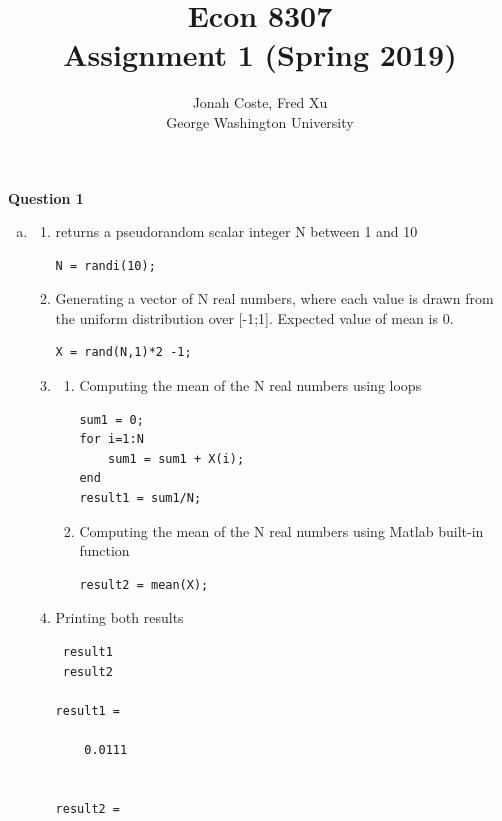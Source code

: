 \documentclass[12pt]{article}
\begin{document}
\begin{onehalfspace}


\title{Econ 8307\\ Assignment 1 (Spring 2019)}
\author{Jonah Coste, Fred Xu\\George Washington University}
\date{}
\maketitle
\parskip 10pt
\textbf{Question 1}\\
\begin{enumerate}[(a)]
	\item
	\begin{enumerate}[1.]
\item
returns a pseudorandom scalar integer N between 1 and 10
\begin{lstlisting}
N = randi(10);
\end{lstlisting}
\item
Generating a vector of N real numbers, where each value is drawn from the uniform distribution over [-1;1]. Expected value of mean is 0.
\begin{lstlisting}
X = rand(N,1)*2 -1;
\end{lstlisting}
\item
\begin{enumerate}[3.1]
	\item
	Computing the mean of the N real numbers using loops
	\begin{lstlisting}
sum1 = 0;
for i=1:N
	sum1 = sum1 + X(i);
end
result1 = sum1/N;
	\end{lstlisting}
	\item
	Computing the mean of the N real numbers using Matlab built-in function
	\begin{lstlisting}
result2 = mean(X);
	\end{lstlisting}
\end{enumerate}
\item
Printing both results
\begin{lstlisting}
 result1
 result2

result1 =

    0.0111


result2 =


\end{lstlisting}
\end{enumerate}
\end{enumerate}
\end{onehalfspace}
\end{document}
